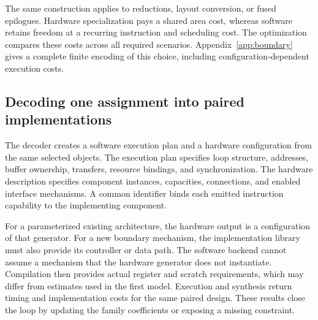 The same construction applies to reductions, layout conversion, or fused epilogues. Hardware specialization pays a shared area cost, whereas software retains freedom at a recurring instruction and scheduling cost. The optimization compares these costs across all required scenarios. Appendix~\ref{app:boundary} gives a complete finite encoding of this choice, including configuration-dependent execution costs.

\subsection{Decoding one assignment into paired implementations}
The decoder creates a software execution plan and a hardware configuration from the same selected objects. The execution plan specifies loop structure, addresses, buffer ownership, transfers, resource bindings, and synchronization. The hardware description specifies component instances, capacities, connections, and enabled interface mechanisms. A common identifier binds each emitted instruction capability to the implementing component.

For a parameterized existing architecture, the hardware output is a configuration of that generator. For a new boundary mechanism, the implementation library must also provide its controller or data path. The software backend cannot assume a mechanism that the hardware generator does not instantiate. Compilation then provides actual register and scratch requirements, which may differ from estimates used in the first model. Execution and synthesis return timing and implementation costs for the same paired design. These results close the loop by updating the family coefficients or exposing a missing constraint.
